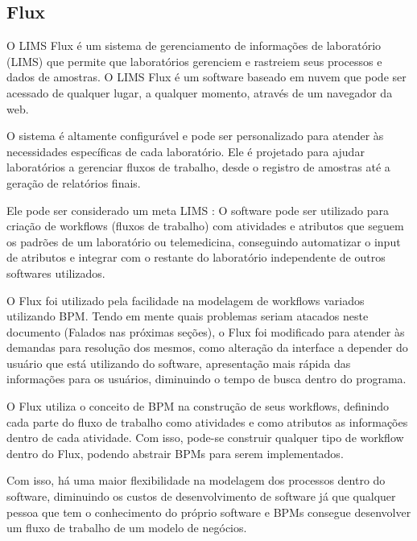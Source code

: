 \subsection{Flux} \label{sec:flux}


O LIMS Flux é um sistema de gerenciamento de informações de laboratório (LIMS) que permite que laboratórios gerenciem e rastreiem seus processos e dados de amostras. O LIMS Flux é um software baseado em nuvem que pode ser acessado de qualquer lugar, a qualquer momento, através de um navegador da web.

O sistema é altamente configurável e pode ser personalizado para atender às necessidades específicas de cada laboratório. Ele é projetado para ajudar laboratórios a gerenciar fluxos de trabalho, desde o registro de amostras até a geração de relatórios finais.

Ele pode ser considerado um meta LIMS \R: O software pode ser utilizado para criação de workflows (fluxos de trabalho) com atividades e atributos que seguem os padrões de um laboratório ou telemedicina, conseguindo automatizar o input de atributos e integrar com o restante do laboratório independente de outros softwares utilizados.


O Flux foi utilizado pela facilidade na modelagem de workflows variados utilizando BPM. Tendo em mente quais problemas seriam atacados neste documento (Falados nas próximas seções), o Flux foi modificado para atender às demandas para resolução dos mesmos, como alteração da interface a depender do usuário que está utilizando do software, apresentação mais rápida das informações para os usuários, diminuindo o tempo de busca dentro do programa.


O Flux utiliza o conceito de BPM na construção de seus workflows, definindo cada parte do fluxo de trabalho como atividades e como atributos as informações dentro de cada atividade. Com isso, pode-se construir qualquer tipo de workflow dentro do Flux, podendo abstrair BPMs para serem implementados.

Com isso, há uma maior flexibilidade na modelagem dos processos dentro do software, diminuindo os custos de desenvolvimento de software já que qualquer pessoa que tem o conhecimento do próprio software e BPMs consegue desenvolver um fluxo de trabalho de um modelo de negócios.

